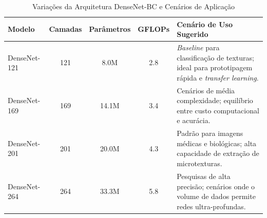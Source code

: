\begin{table}[H]
\centering
\caption{Variações da Arquitetura DenseNet-BC e Cenários de Aplicação}
\label{tab:densenet_variacoes}
\begin{tabular}{@{}lccc p{6.5cm}@{}}
\toprule
\textbf{Modelo} & \textbf{Camadas} & \textbf{Parâmetros} & \textbf{GFLOPs} & \textbf{Cenário de Uso Sugerido} \\ \midrule
DenseNet-121 & 121 & 8.0M & 2.8 & \textit{Baseline} para classificação de texturas; ideal para prototipagem rápida e \textit{transfer learning}. \\
DenseNet-169 & 169 & 14.1M & 3.4 & Cenários de média complexidade; equilíbrio entre custo computacional e acurácia. \\
DenseNet-201 & 201 & 20.0M & 4.3 & Padrão para imagens médicas e biológicas; alta capacidade de extração de microtexturas. \\
DenseNet-264 & 264 & 33.3M & 5.8 & Pesquisas de alta precisão; cenários onde o volume de dados permite redes ultra-profundas. \\ \bottomrule
\end{tabular}
\end{table}